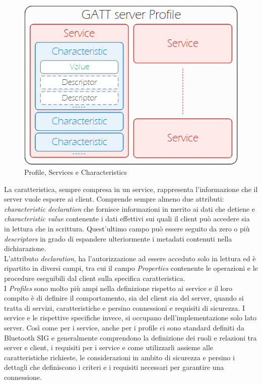 \begin{figure}[!ht]
    \centering
    \includegraphics[width =\textwidth]{images/Services GATT.png}
    \caption{Profile, Services e Characteristics}
    \label{fig:profile_GATT}
\end{figure}

\noindent La caratteristica, sempre compresa in un service, rappresenta l'informazione che il server vuole esporre ai client. Comprende sempre almeno due attributi: \textit{characteristic declaration} che fornisce informazioni in merito ai dati che detiene e \textit{characteristic value} contenente i dati effettivi sui quali il client può accedere sia in lettura che in scrittura. Quest'ultimo campo può essere seguito da zero o più \textit{descriptors} in grado di espandere ulteriormente i metadati contenuti nella dichiarazione.\\
L'attributo \textit{declaration}, ha l'autorizzazione ad essere acceduto solo in lettura ed è ripartito in diversi campi, tra cui il campo \textit{Properties} contenente le operazioni e le procedure eseguibili dal client sulla specifica caratteristica.\\

\noindent I \textit{Profiles} sono molto più ampi nella definizione rispetto ai service e il loro compito è di definire il comportamento, sia del client sia del server, quando si tratta di servizi, caratteristiche e persino connessioni e requisiti di sicurezza. I service e le rispettive specifiche invece, si occupano dell'implementazione solo lato server. Così come per i service, anche per i profile ci sono standard definiti da Bluetooth SIG e generalmente comprendono la definizione dei ruoli e relazioni tra server e client, i requisiti per i service e come utilizzarli assieme alle caratteristiche richieste, le considerazioni in ambito di sicurezza e persino i dettagli che definiscono i criteri e i requisiti necessari per garantire una connessione.

